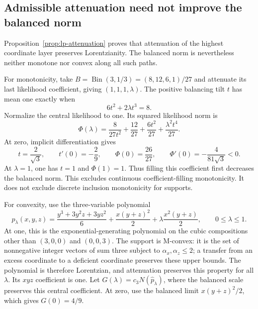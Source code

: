 \documentclass[11pt,a4paper]{article}
\theoremstyle{definition}
\theoremstyle{remark}
\begin{document}
\subsection{Admissible attenuation need not improve the balanced norm}

Proposition~\ref{prop:lp-attenuation} proves that attenuation of the highest
coordinate layer preserves Lorentzianity.
The balanced norm is nevertheless neither monotone nor convex along all
such paths.

For monotonicity, take $B=\operatorname{Bin}(3,1/3)=(8,12,6,1)/27$ and
attenuate its last likelihood coefficient, giving $(1,1,1,\lambda)$.
The positive balancing tilt $t$ has mean one exactly when
\[
 6t^2+2\lambda t^3=8.
\]
Normalize the central likelihood to one.
Its squared likelihood norm is
\[
 \Phi(\lambda)=\frac8{27t^2}+\frac{12}{27}
 +\frac{6t^2}{27}+\frac{\lambda^2t^4}{27}.
\]
At zero, implicit differentiation gives
\[
 t=\frac2{\sqrt3},\qquad t'(0)=-\frac29,\qquad
 \Phi(0)=\frac{26}{27},\qquad
 \Phi'(0)=-\frac4{81\sqrt3}<0.
\]
At $\lambda=1$, one has $t=1$ and $\Phi(1)=1$.
Thus filling this coefficient first decreases the balanced norm.
This excludes continuous coefficient-filling monotonicity.
It does not exclude discrete inclusion monotonicity for supports.

For convexity, use the three-variable polynomial
\[
 p_\lambda(x,y,z)=\frac{y^3+3y^2z+3yz^2}{6}
 +\frac{x(y+z)^2}{2}+\lambda\frac{x^2(y+z)}2,
 \qquad0\le\lambda\le1.
\]
At one, this is the exponential-generating polynomial on the cubic
compositions other than $(3,0,0)$ and $(0,0,3)$.
The support is M-convex: it is the set of nonnegative integer vectors of
sum three subject to $\alpha_x,\alpha_z\le2$; a transfer from an excess
coordinate to a deficient coordinate preserves these upper bounds.
The polynomial is therefore Lorentzian, and attenuation preserves this
property for all $\lambda$.
Its $xyz$ coefficient is one.
Let $G(\lambda)=c_3N(\widehat p_\lambda)$, where the balanced scale preserves
this central coefficient.
At zero, use the balanced limit $x(y+z)^2/2$, which gives $G(0)=4/9$.
\end{document}
